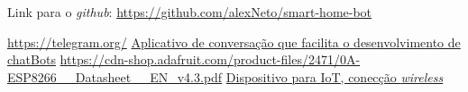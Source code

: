 \documentclass[10pt,a4paper,twocolumn]{article}
\begin{document}
 Link para o \textit{github}: \url{https://github.com/alexNeto/smart-home-bot}


\begin{thebibliography}{99}
  \url{https://telegram.org/}
\href{https://telegram.org/}{Aplicativo de conversação que facilita o desenvolvimento de chatBots}
 \url{https://cdn-shop.adafruit.com/product-files/2471/0A-ESP8266__Datasheet__EN_v4.3.pdf}
\href{https://cdn-shop.adafruit.com/product-files/2471/0A-ESP8266__Datasheet__EN_v4.3.pdf}{Dispositivo para IoT, conecção \textit{wireless}} 
\end{thebibliography}
\end{document}
